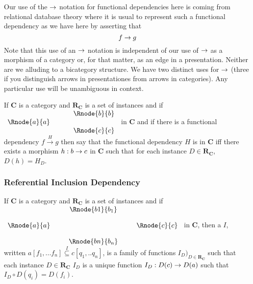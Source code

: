\documentclass[10pt,a4paper]{article}
\theoremstyle{remark}
\newcommand{\catc}[1][C]{\textbf{#1}}
\newcommand{\reqt}{\textbf{R}}
\newcommand{\reqtc}[1][\catc]{\reqt_{#1}}
\newcommand{\fundep}[3]{#2 \xrightarrow{#1} #3}
\begin{document}
Our use of the $\rightarrow$ notation for functional dependencies here is coming from relational database theory where it is usual to represent such a functional dependency as we have here by asserting that 
$$
f \rightarrow g
$$
Note that this use of an $\rightarrow$ notation is independent of our use of $\rightarrow$ as a morphism of a category 
or, for that matter, as an edge in a presentation. Neither are we alluding to a bicategory structure. We have two distinct uses for $\rightarrow$ (three if you distinguish arrows in presentationes from arrows in categories). Any particular use will be unambiguous in context.

\begin{definition}
If $\catc$ is a category and $\reqtc$ is a set of instances and if
$
\begin{array}{c p{0.5cm} c  }
             &&   \Rnode{b}{b} \\[0.01cm]
\Rnode{a}{a} &&                \\[0.01cm] 
             &&   \Rnode{c}{c}         
\end{array} 
$
in $\catc$ 
and if there is a functional dependency $\fundep{H}{f}{g}$ then say that 
the functional dependency $H$ is  in $\catc$ 
iff there exists a morphism $h:b \rightarrow c$ in $\catc$ such that for each instance $D \in \reqtc$, $D(h)=H_D$.
\end{definition}

\subsubsection{Referential Inclusion Dependency}
\begin{definition}
If $\catc$ is a category and $\reqtc$ is a set of instances and if
$
\begin{array}{c p{0.25cm} c  p{0.25cm} c }
             &&   \Rnode{b1}{b_1} &&              \\[0.4cm]
\Rnode{a}{a} &&                   && \Rnode{c}{c} \\[0.4cm]
             &&   \Rnode{bn}{b_n} &&              
\end{array} 
$
in $\catc$, then a  $I$, written $a[f_1,...f_n] \overset{I}{\subseteq} c[q_1,..q_n]$, is a family of functions $I_D)_{D \in \reqtc}$
such that each instance $D \in \reqtc$ $I_D$ is a unique function $I_D : D(c) \rightarrow D(a)$ such that
$I_D \circ D(q_i) = D(f_i)$.
\end{definition}
\end{document}
